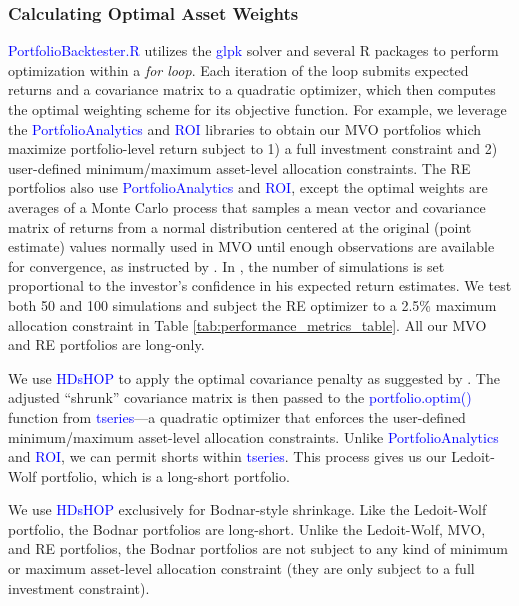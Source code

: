 \documentclass[12pt,letterpaper]{article}
\begin{document}
\subsubsection{Calculating Optimal Asset Weights}
\textcolor{blue}{PortfolioBacktester.R} utilizes the \textcolor{blue}{glpk} solver and several R packages to perform optimization within a \textit{for loop}. Each iteration of the loop submits expected returns and a covariance matrix to a quadratic optimizer, which then computes the optimal weighting scheme for its objective function. For example, we leverage the \textcolor{blue}{PortfolioAnalytics} and \textcolor{blue}{ROI} libraries to obtain our MVO portfolios which maximize portfolio-level return subject to 1) a full investment constraint and 2) user-defined minimum/maximum asset-level allocation constraints. The RE portfolios also use \textcolor{blue}{PortfolioAnalytics} and \textcolor{blue}{ROI}, except the optimal weights are averages of a Monte Carlo process that samples a mean vector and covariance matrix of returns from a normal distribution centered at the original (point estimate) values normally used in MVO until enough observations are available for convergence, as instructed by . In , the number of simulations is set proportional to the investor's confidence in his expected return estimates. We test both 50 and 100 simulations and subject the RE optimizer to a 2.5\% maximum allocation constraint in Table \ref{tab:performance_metrics_table}. All our MVO and RE portfolios are long-only.

We use \textcolor{blue}{HDsHOP} to apply the optimal covariance penalty as suggested by . The adjusted “shrunk” covariance matrix is then passed to the \textcolor{blue}{portfolio.optim()} function from \textcolor{blue}{tseries}---a quadratic optimizer that enforces the user-defined minimum/maximum asset-level allocation constraints. Unlike \textcolor{blue}{PortfolioAnalytics} and \textcolor{blue}{ROI}, we can permit shorts within \textcolor{blue}{tseries}. This process gives us our Ledoit-Wolf portfolio, which is a long-short portfolio.

We use \textcolor{blue}{HDsHOP} exclusively for Bodnar-style shrinkage. Like the Ledoit-Wolf portfolio, the Bodnar portfolios are long-short. Unlike the Ledoit-Wolf, MVO, and RE portfolios, the Bodnar portfolios are not subject to any kind of minimum or maximum asset-level allocation constraint (they are only subject to a full investment constraint).
\end{document}
